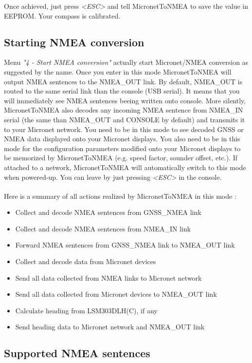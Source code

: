 \documentclass{report}
\begin{document}
Once achieved, just press \emph{<ESC>} and tell MicronetToNMEA to save the value in EEPROM. Your compass is calibrated.

\subsection{Starting NMEA conversion}

Menu \emph{"4 - Start NMEA conversion"} actually start Micronet/NMEA conversion as suggested by the name. Once you enter in this mode MicronetToNMEA will output NMEA sentences to the NMEA\_OUT link. By default, NMEA\_OUT is routed to the same serial link than the console (USB serial). It means that you will immediately see NMEA sentences beeing written onto console. More silently, MicronetToNMEA also decodes any incoming NMEA sentence from NMEA\_IN serial (the same than NMEA\_OUT and CONSOLE by default) and transmits it to your Micronet network.
You need to be in this mode to see decoded GNSS or NMEA data displayed onto your Micronet displays. You also need to be in this mode for the configuration parameters modified onto your Micronet displays to be memorized by MicronetToNMEA (e.g. speed factor, sounder offset, etc.).
If attached to a network, MicronetToNMEA will automatically switch to this mode when powered-up. You can leave by just pressing \emph{<ESC>} in the console.
\\
\\
Here is a summary of all actions realized by MicronetToNMEA in this mode :
\begin{itemize}
	\item Collect and decode NMEA sentences from GNSS\_NMEA link
	\item Collect and decode NMEA sentences from NMEA\_IN link
	\item Forward NMEA sentences from GNSS\_NMEA link to NMEA\_OUT link
	\item Collect and decode data from Micronet devices
	\item Send all data collected from NMEA links to Micronet network
	\item Send all data collected from Micronet devices to NMEA\_OUT link
	\item Calculate heading from LSM303DLH(C), if any
	\item Send heading data to Micronet network and NMEA\_OUT link
\end{itemize}

\subsection{Supported NMEA sentences}
\end{document}
